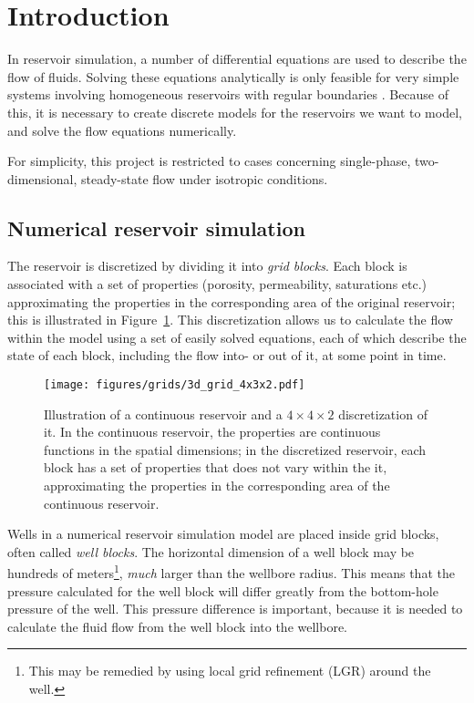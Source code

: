 
\section{Introduction} %
\label{sec:introduction}
In reservoir simulation, a number of differential equations are used to describe the flow of fluids. Solving these equations analytically is only feasible for very simple systems involving homogeneous reservoirs with regular boundaries \cite{Peaceman1977Fundamentals}. Because of this, it is necessary to create discrete models for the reservoirs we want to model, and solve the flow equations numerically.

For simplicity, this project is restricted to cases concerning single-phase, two-dimensional, steady-state flow under isotropic conditions.

\subsection{Numerical reservoir simulation} %
\label{sub:numerical_reservoir_simulation}


The reservoir is discretized by dividing it into \emph{grid blocks}. Each block is associated with a set of properties (porosity, permeability, saturations etc.) approximating the properties in the corresponding area of the original reservoir; this is illustrated in Figure~\ref{fig:grid-discretization}. This discretization allows us to calculate the flow within the model using a set of easily solved equations, each of which describe the state of each block, including the flow into- or out of it, at some point in time.

\begin{figure}[htbp]
    \centering
    \texttt{[image: figures/grids/3d\_grid\_4x3x2.pdf]}
    \caption{Illustration of a continuous reservoir and a $4\times 4\times 2$ discretization of it. In the continuous reservoir, the properties are continuous functions in the spatial dimensions; in the discretized reservoir, each block has a set of properties that does not vary within the it, approximating the properties in the corresponding area of the continuous reservoir.}
    \label{fig:grid-discretization}
\end{figure}


Wells in a numerical reservoir simulation model are placed inside grid blocks, often called \emph{well blocks}. The horizontal dimension of a well block may be hundreds of meters\footnote{This may be remedied by using local grid refinement (LGR) around the well.}, \emph{much} larger than the wellbore radius. This means that the pressure calculated for the well block will differ greatly from the bottom-hole pressure of the well. This pressure difference is important, because it is needed to calculate the fluid flow  from the well block into the wellbore.

